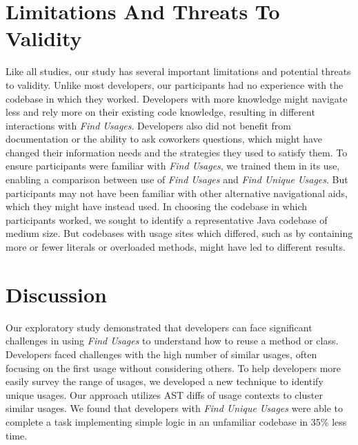 \documentclass[conference]{IEEEtran}
\begin{document}


\section{Limitations And Threats To Validity}
Like all studies, our study has several important limitations and potential threats to validity. 
Unlike most developers, our participants had no experience with the codebase in which they worked. Developers with more knowledge might navigate less and rely more on their existing code knowledge, resulting in different interactions with \textit{Find Usages}. 
Developers also did not benefit from documentation or the ability to ask coworkers questions, which might have changed their information needs and the strategies they used to satisfy them. 
To ensure participants were familiar with \textit{Find Usages}, we trained them in its use, enabling a comparison between use of \textit{Find Usages} and \textit{Find Unique Usages}. But participants may not have been familiar with other alternative navigational aids, which they might have instead used. In choosing the codebase in which participants worked, we sought to identify a representative Java codebase of medium size. But codebases with usage sites which differed, such as by containing more or fewer literals or overloaded methods, might have led to different results.



\section{Discussion}
Our exploratory study demonstrated that developers can face significant challenges in using \textit{Find Usages} to understand how to reuse a method or class. Developers faced challenges with the high number of similar usages, often focusing on the first usage without considering others. To help developers more easily survey the range of usages, we developed a new technique to identify unique usages. Our approach utilizes AST diffs of usage contexts to cluster similar usages. We found that developers with \textit{Find Unique Usages} were able to complete a task implementing simple logic in an unfamiliar codebase in 35\% less time. 
\end{document}
